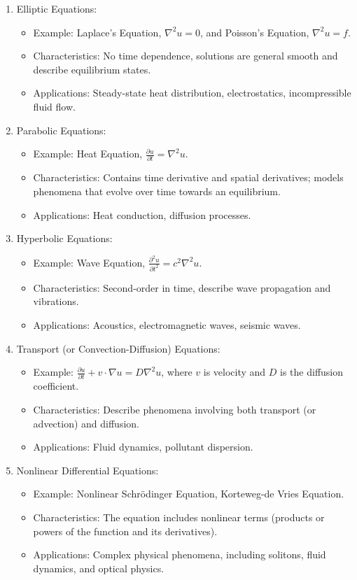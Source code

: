 \documentclass[a4paper,12pt]{article} %
\begin{document}
\begin{enumerate}
\item Elliptic Equations:
\begin{itemize}
   \item Example: Laplace's Equation, \(\nabla^2 u = 0\), and Poisson's Equation, \(\nabla^2 u = f\).
   \item Characteristics: No time dependence, solutions are general 
   smooth and describe equilibrium states.
   \item Applications: Steady-state heat distribution, electrostatics, incompressible fluid flow.
\end{itemize}
\item Parabolic Equations:
\begin{itemize}
   \item Example: Heat Equation, \(\frac{\partial u}{\partial t} = \nabla^2 u\).
   \item Characteristics: Contains time derivative and spatial derivatives; models phenomena that evolve over time towards an equilibrium.
   \item Applications: Heat conduction, diffusion processes.
\end{itemize}
\item Hyperbolic Equations:
\begin{itemize}
   \item Example: Wave Equation, \(\frac{\partial^2 u}{\partial t^2} = c^2 \nabla^2 u\).
   \item Characteristics: Second-order in time, describe wave propagation and vibrations.
   \item Applications: Acoustics, electromagnetic waves, seismic waves.
\end{itemize}

\item Transport (or Convection-Diffusion) Equations:
\begin{itemize}
   \item Example: \(\frac{\partial u}{\partial t} + v \cdot \nabla u = D \nabla^2 u\), where \(v\) is velocity and \(D\) is the diffusion coefficient.
   \item Characteristics: Describe phenomena involving both transport (or advection) and diffusion.
   \item Applications: Fluid dynamics, pollutant dispersion.
\end{itemize}

\item Nonlinear Differential Equations:
\begin{itemize}
   \item Example: Nonlinear Schrödinger Equation, Korteweg-de Vries Equation.
   \item Characteristics: The equation includes nonlinear terms (products or powers of the function and its derivatives).
   \item Applications: Complex physical phenomena, including solitons, fluid dynamics, and optical physics.
\end{itemize}


\end{enumerate}
\end{document}
